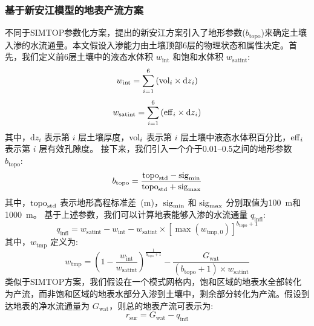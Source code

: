 \subsubsection{基于新安江模型的地表产流方案}
不同于SIMTOP参数化方案，\cite{RENJUN1992371}提出的新安江方案引入了地形参数($b_\text{topo}$)来确定土壤入渗的水流通量。本文假设入渗能力由土壤顶部6层的物理状态和属性决定。首先，我们定义前6层土壤中的液态水体积 $w_{\mathrm{{int}}}$ 和饱和水体积 $w_{\mathrm{{satint}}}$:
\begin{equation}
w_{\mathrm{{int}}} = \sum_{i=1}^{6}\left( {\rm vol}_{i} \times {{\mathrm {d}} z}_{i} \right)
\end{equation}
\begin{equation}
w_{\mathrm{{satint}}} = \sum_{i=1}^{6}\left( {\rm eff}_{i} \times {{\mathrm {d}} z}_{i} \right)
\end{equation}
其中，${{\mathrm {d}} z}_{i}$ 表示第 $i$ 层土壤厚度，${\rm vol}_{i}$ 表示第 $i$ 层土壤中液态水体积百分比，${\rm eff}_{i}$ 表示第 $i$ 层有效孔隙度。
接下来，我们引入一个介于0.01--0.5之间的地形参数 $b_\text{topo}$:
\begin{equation}
b_\text{topo}=\frac{{\rm topo}_\text{std}-{\rm sig}_\text{min}}{{\rm topo}_\text{std}+{\rm sig}_\text{max}}
\end{equation}
其中，${\rm topo}_\text{std}$ 表示地形高程标准差~(m)，${\rm sig}_\text{min}$ 和 ${\rm sig}_\text{max}$ 分别取值为100~m和1000~m。
基于上述参数，我们可以计算地表能够入渗的水流通量 $q_{\mathrm{infl}}$:
\begin{equation}
q_{\mathrm{infl}}=w_{\mathrm{{satint}}}-w_{\mathrm{{int}}}-w_{\mathrm{{satint}}} \times \left[\max\left(w_{\mathrm{{tmp}},0}\right)\right]^{b_\text{topo}+1}
\end{equation}
其中，$w_\text{tmp}$ 定义为:
\begin{equation}
w_\text{tmp}=\left(1-\frac{w_\text{int}}{w_\text{satint}}\right)^\frac{1}{b_\text{topo}+1}-\frac{G_\text{wat}}{\left(b_\text{topo}+1\right)\times w_\text{satint}} 
\end{equation}
类似于SIMTOP方案，我们假设在一个模式网格内，饱和区域的地表水全部转化为产流，而非饱和区域的地表水部分入渗到土壤中，剩余部分转化为产流。假设到达地表的净水流通量为 $G_\text{wat}$，则总的地表产流可表示为:
\begin{equation}
r_\text{sur}=G_\text{wat}-q_{\mathrm{infl}}
\end{equation}

